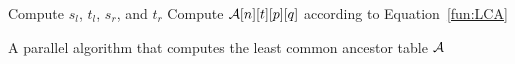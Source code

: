 \begin{algorithm}[!thb]
\SetAlgoNoLine
{}

 {
   {
     {
      Compute $s_l$, $t_l$, $s_r$, and $t_r$ \;
       {
        Compute ${\cal A}[n][t][p][q]$ according to Equation~\ref{fun:LCA} \;
      }
    }
  }
}

\caption{A parallel algorithm that computes the least common ancestor
  table $\cal A$}
\label{alg:parallel-LCA}
\end{algorithm}
